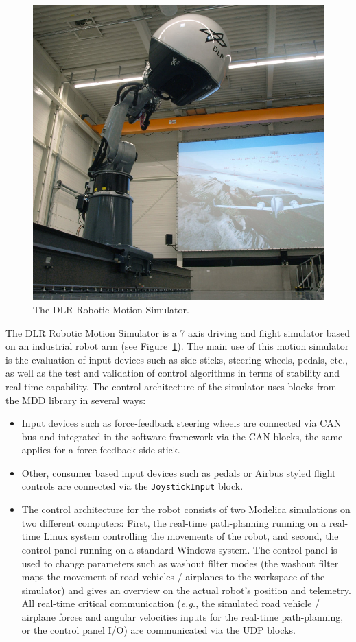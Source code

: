 \documentclass{resources/modelica}
\newcommand{\modelica}[1]{\lstinline[language=modelica]|#1|}
\begin{document}
\begin{figure}[tb]
  \centering
  \includegraphics[width=0.9\columnwidth]{figures/DLRRoboticMotionSimulator}
  \caption{The DLR Robotic Motion Simulator.}
  \label{fig:DLRRoboticMotionSimulator}
\end{figure}

The DLR Robotic Motion Simulator \citep{bellmann2011dlr} is a 7 axis driving and
flight simulator based on an industrial robot arm (see
Figure~\ref{fig:DLRRoboticMotionSimulator}). The main use of this motion
simulator is the evaluation of input devices such as side-sticks, steering
wheels, pedals, etc., as well as the test and validation of control algorithms
in terms of stability and real-time capability. The control architecture of the
simulator uses blocks from the MDD library in several ways:
\begin{itemize}
  \item Input devices such as force-feedback steering wheels are connected via CAN bus
and integrated in the software framework via the CAN blocks, the same
applies for a force-feedback side-stick.
  \item Other, consumer based input devices such as pedals or Airbus styled flight
controls are connected via the \modelica{JoystickInput} block.
  \item The control architecture for the robot consists of two Modelica simulations on
two different computers: First, the real-time path-planning running on a
real-time Linux system controlling the movements of the robot, and second, the
control panel running on a standard Windows system. The control panel is used to
change parameters such as washout filter modes (the washout filter maps the
movement of road vehicles / airplanes to the workspace of the simulator) and
gives an overview on the actual robot's position and telemetry. All real-time critical
communication (\textit{e.g.}, the simulated road vehicle / airplane forces and
angular velocities inputs for the real-time path-planning, or the control panel
I/O) are communicated via the UDP blocks.
\end{itemize}
\end{document}
